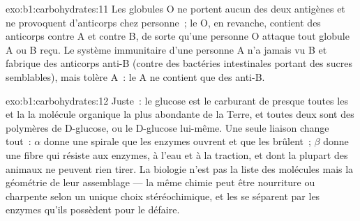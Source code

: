 \begin{solution}{exo:b1:carbohydrates:11}
Les globules O ne portent aucun des deux antigènes et ne provoquent
d'anticorps chez personne~; le  O, en revanche, contient des
anticorps contre A et contre B, de sorte qu'une personne O attaque tout
globule A ou B reçu. Le système immunitaire d'une personne A n'a jamais
vu B et fabrique des anticorps anti-B (contre des bactéries intestinales
portant des sucres semblables), mais tolère A~: le  A ne contient
que des anti-B.
\end{solution}

\begin{solution}{exo:b1:carbohydrates:12}
Juste~: le glucose est le carburant de presque toutes les  et la
 la molécule organique la plus abondante de la Terre, et toutes
deux sont des polymères de D-glucose, ou le D-glucose lui-même. Une
seule liaison change tout~: $\alpha$ donne une spirale que les enzymes
ouvrent et que les  brûlent~; $\beta$ donne une fibre qui
résiste aux enzymes, à l'eau et à la traction, et dont la plupart des
animaux ne peuvent rien tirer. La biologie n'est pas la liste des
molécules mais la géométrie de leur assemblage --- la même chimie peut
être nourriture ou charpente selon un unique choix stéréochimique, et
les  se séparent par les enzymes qu'ils possèdent pour le
défaire.
\end{solution}

